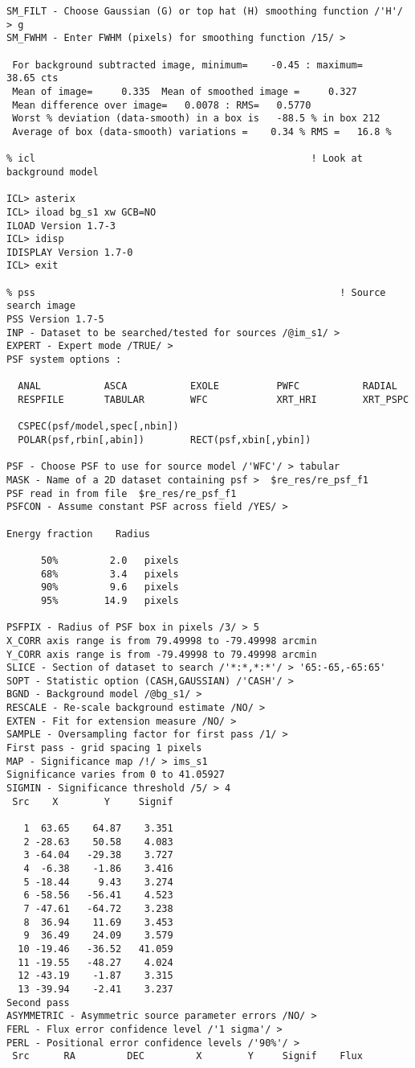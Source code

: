 \begin{small}
\begin{verbatim}
SM_FILT - Choose Gaussian (G) or top hat (H) smoothing function /'H'/ > g
SM_FWHM - Enter FWHM (pixels) for smoothing function /15/ >

 For background subtracted image, minimum=    -0.45 : maximum=    38.65 cts
 Mean of image=     0.335  Mean of smoothed image =     0.327
 Mean difference over image=   0.0078 : RMS=   0.5770
 Worst % deviation (data-smooth) in a box is   -88.5 % in box 212
 Average of box (data-smooth) variations =    0.34 % RMS =   16.8 %

% icl                                                ! Look at background model

ICL> asterix
ICL> iload bg_s1 xw GCB=NO
ILOAD Version 1.7-3
ICL> idisp
IDISPLAY Version 1.7-0
ICL> exit

% pss                                                     ! Source search image
PSS Version 1.7-5
INP - Dataset to be searched/tested for sources /@im_s1/ >
EXPERT - Expert mode /TRUE/ >
PSF system options :

  ANAL           ASCA           EXOLE          PWFC           RADIAL
  RESPFILE       TABULAR        WFC            XRT_HRI        XRT_PSPC

  CSPEC(psf/model,spec[,nbin])
  POLAR(psf,rbin[,abin])        RECT(psf,xbin[,ybin])

PSF - Choose PSF to use for source model /'WFC'/ > tabular
MASK - Name of a 2D dataset containing psf >  $re_res/re_psf_f1
PSF read in from file  $re_res/re_psf_f1
PSFCON - Assume constant PSF across field /YES/ >

Energy fraction    Radius

      50%         2.0   pixels
      68%         3.4   pixels
      90%         9.6   pixels
      95%        14.9   pixels

PSFPIX - Radius of PSF box in pixels /3/ > 5
X_CORR axis range is from 79.49998 to -79.49998 arcmin
Y_CORR axis range is from -79.49998 to 79.49998 arcmin
SLICE - Section of dataset to search /'*:*,*:*'/ > '65:-65,-65:65'
SOPT - Statistic option (CASH,GAUSSIAN) /'CASH'/ >
BGND - Background model /@bg_s1/ >
RESCALE - Re-scale background estimate /NO/ >
EXTEN - Fit for extension measure /NO/ >
SAMPLE - Oversampling factor for first pass /1/ >
First pass - grid spacing 1 pixels
MAP - Significance map /!/ > ims_s1
Significance varies from 0 to 41.05927
SIGMIN - Significance threshold /5/ > 4
 Src    X        Y     Signif

   1  63.65    64.87    3.351
   2 -28.63    50.58    4.083
   3 -64.04   -29.38    3.727
   4  -6.38    -1.86    3.416
   5 -18.44     9.43    3.274
   6 -58.56   -56.41    4.523
   7 -47.61   -64.72    3.238
   8  36.94    11.69    3.453
   9  36.49    24.09    3.579
  10 -19.46   -36.52   41.059
  11 -19.55   -48.27    4.024
  12 -43.19    -1.87    3.315
  13 -39.94    -2.41    3.237
Second pass
ASYMMETRIC - Asymmetric source parameter errors /NO/ >
FERL - Flux error confidence level /'1 sigma'/ >
PERL - Positional error confidence levels /'90%'/ >
 Src      RA         DEC         X        Y     Signif    Flux


\end{verbatim}
\end{small}
